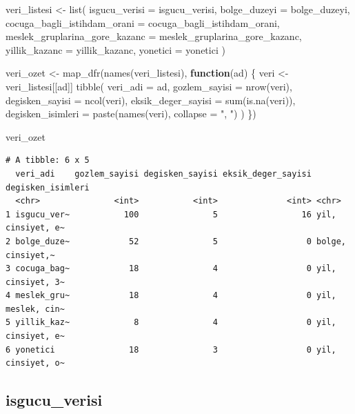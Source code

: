 \documentclass[
  11pt,
  a4paper,
  DIV=11,
  numbers=noendperiod]{scrartcl}
\newenvironment{Shaded}{\begin{snugshade}}{\end{snugshade}}
\newcommand{\AttributeTok}[1]{\textcolor[rgb]{0.40,0.45,0.13}{#1}}
\newcommand{\ControlFlowTok}[1]{\textcolor[rgb]{0.00,0.23,0.31}{\textbf{#1}}}
\newcommand{\FunctionTok}[1]{\textcolor[rgb]{0.28,0.35,0.67}{#1}}
\newcommand{\NormalTok}[1]{\textcolor[rgb]{0.00,0.23,0.31}{#1}}
\newcommand{\OtherTok}[1]{\textcolor[rgb]{0.00,0.23,0.31}{#1}}
\newcommand{\StringTok}[1]{\textcolor[rgb]{0.13,0.47,0.30}{#1}}
\begin{document}
\begin{Shaded}
\begin{Highlighting}[]
\NormalTok{veri\_listesi }\OtherTok{\textless{}{-}} \FunctionTok{list}\NormalTok{(}
  \AttributeTok{isgucu\_verisi =}\NormalTok{ isgucu\_verisi,}
  \AttributeTok{bolge\_duzeyi =}\NormalTok{ bolge\_duzeyi,}
  \AttributeTok{cocuga\_bagli\_istihdam\_orani =}\NormalTok{ cocuga\_bagli\_istihdam\_orani,}
  \AttributeTok{meslek\_gruplarina\_gore\_kazanc =}\NormalTok{ meslek\_gruplarina\_gore\_kazanc,}
  \AttributeTok{yillik\_kazanc =}\NormalTok{ yillik\_kazanc,}
  \AttributeTok{yonetici =}\NormalTok{ yonetici}
\NormalTok{)}

\NormalTok{veri\_ozet }\OtherTok{\textless{}{-}} \FunctionTok{map\_dfr}\NormalTok{(}\FunctionTok{names}\NormalTok{(veri\_listesi), }\ControlFlowTok{function}\NormalTok{(ad) \{}
\NormalTok{  veri }\OtherTok{\textless{}{-}}\NormalTok{ veri\_listesi[[ad]]}
  \FunctionTok{tibble}\NormalTok{(}
    \AttributeTok{veri\_adi =}\NormalTok{ ad,}
    \AttributeTok{gozlem\_sayisi =} \FunctionTok{nrow}\NormalTok{(veri),}
    \AttributeTok{degisken\_sayisi =} \FunctionTok{ncol}\NormalTok{(veri),}
    \AttributeTok{eksik\_deger\_sayisi =} \FunctionTok{sum}\NormalTok{(}\FunctionTok{is.na}\NormalTok{(veri)),}
    \AttributeTok{degisken\_isimleri =} \FunctionTok{paste}\NormalTok{(}\FunctionTok{names}\NormalTok{(veri), }\AttributeTok{collapse =} \StringTok{", "}\NormalTok{)}
\NormalTok{  )}
\NormalTok{\})}

\NormalTok{veri\_ozet}
\end{Highlighting}
\end{Shaded}

\begin{verbatim}
# A tibble: 6 x 5
  veri_adi    gozlem_sayisi degisken_sayisi eksik_deger_sayisi degisken_isimleri
  <chr>               <int>           <int>              <int> <chr>            
1 isgucu_ver~           100               5                 16 yil, cinsiyet, e~
2 bolge_duze~            52               5                  0 bolge, cinsiyet,~
3 cocuga_bag~            18               4                  0 yil, cinsiyet, 3~
4 meslek_gru~            18               4                  0 yil, meslek, cin~
5 yillik_kaz~             8               4                  0 yil, cinsiyet, e~
6 yonetici               18               3                  0 yil, cinsiyet, o~
\end{verbatim}

\subsection{isgucu\_verisi}\label{isgucu_verisi}
\end{document}
